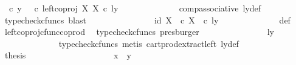 \begin{isabellebody}
\ {\isachardoublequoteopen}{\isasymrho}\ {\isasymcirc}\isactrlsub c\ y\ {\isacharequal}{\kern0pt}\ {\isacharparenleft}{\kern0pt}{\isasymrho}\ {\isasymcirc}\isactrlsub c\ left{\isacharunderscore}{\kern0pt}coproj\ X\ X{\isacharparenright}{\kern0pt}\ {\isasymcirc}\isactrlsub c\ ly{\isachardoublequoteclose}\isanewline
\ \ \ \ \ \ \ \ \ \ \ \ \isamarkupfalse%
\ comp{\isacharunderscore}{\kern0pt}associative{}\ ly{\isacharunderscore}{\kern0pt}def\ \isamarkupfalse%
\ {\isacharparenleft}{\kern0pt}typecheck{\isacharunderscore}{\kern0pt}cfuncs{\isacharcomma}{\kern0pt}\ blast{\isacharparenright}{\kern0pt}\isanewline
\ \ \ \ \ \ \ \ \ \ \isamarkupfalse%
\ \isamarkupfalse%
\ {\isachardoublequoteopen}{\isachardot}{\kern0pt}{\isachardot}{\kern0pt}{\isachardot}{\kern0pt}\ {\isacharequal}{\kern0pt}\ {\isasymlangle}id\ X{\isacharcomma}{\kern0pt}\ {\isasymt}\ {\isasymcirc}\isactrlsub c\ {\isasymbeta}\isactrlbsub X\isactrlesub {\isasymrangle}\ \ {\isasymcirc}\isactrlsub c\ ly{\isachardoublequoteclose}\isanewline
\ \ \ \ \ \ \ \ \ \ \ \ \isamarkupfalse%
\ {\isasymrho}{\isacharunderscore}{\kern0pt}def\ \ \isamarkupfalse%
\ left{\isacharunderscore}{\kern0pt}coproj{\isacharunderscore}{\kern0pt}cfunc{\isacharunderscore}{\kern0pt}coprod\ \isamarkupfalse%
\ {\isacharparenleft}{\kern0pt}typecheck{\isacharunderscore}{\kern0pt}cfuncs{\isacharcomma}{\kern0pt}\ presburger{\isacharparenright}{\kern0pt}\isanewline
\ \ \ \ \ \ \ \ \ \ \isamarkupfalse%
\ \isamarkupfalse%
\ {\isachardoublequoteopen}{\isachardot}{\kern0pt}{\isachardot}{\kern0pt}{\isachardot}{\kern0pt}\ {\isacharequal}{\kern0pt}\ {\isasymlangle}ly{\isacharcomma}{\kern0pt}\ {\isasymt}{\isasymrangle}{\isachardoublequoteclose}\isanewline
\ \ \ \ \ \ \ \ \ \ \ \ \isamarkupfalse%
\ {\isacharparenleft}{\kern0pt}typecheck{\isacharunderscore}{\kern0pt}cfuncs{\isacharcomma}{\kern0pt}\ metis\ cart{\isacharunderscore}{\kern0pt}prod{\isacharunderscore}{\kern0pt}extract{\isacharunderscore}{\kern0pt}left\ ly{\isacharunderscore}{\kern0pt}def{\isacharparenright}{\kern0pt}\isanewline
\ \ \ \ \ \ \ \ \ \ \isamarkupfalse%
\ \isamarkupfalse%
\ {\isacharquery}{\kern0pt}thesis\isacommand{{\isachardot}{\kern0pt}}\isamarkupfalse%
\isanewline
\ \ \ \ \ \ \ \ \isamarkupfalse%
\isanewline
\ \ \ \ \ \ \ \ \isamarkupfalse%
\ \isamarkupfalse%
\ {\isachardoublequoteopen}x\ {\isacharequal}{\kern0pt}\ y{\isachardoublequoteclose}\isanewline

\end{isabellebody}
